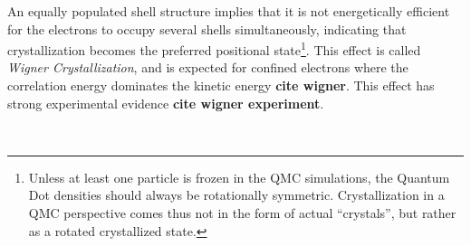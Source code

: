 An equally populated shell structure implies that it is not energetically efficient for the electrons to occupy several shells simultaneously, indicating that crystallization becomes the preferred positional state\footnote{Unless at least one particle is frozen in the QMC simulations, the Quantum Dot densities should always be rotationally symmetric. Crystallization in a QMC perspective comes thus not in the form of actual ``crystals'', but rather as a rotated crystallized state.}. This effect is called \textit{Wigner Crystallization}, and is expected for confined electrons where the correlation energy dominates the kinetic energy \textbf{cite wigner}. This effect has strong experimental evidence \textbf{cite wigner experiment}. 


\begin{figure}
 \begin{center}
   \\

\end{center}
\end{figure}
